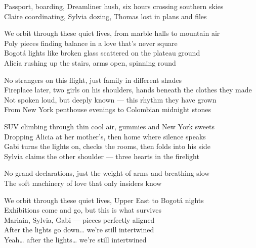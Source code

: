 \begin{lyrics}
Passport, boarding, Dreamliner hush, six hours crossing southern skies\\
Claire coordinating, Sylvia dozing, Thomas lost in plans and files

We orbit through these quiet lives, from marble halls to mountain air\\
Poly pieces finding balance in a love that’s never square\\
Bogotá lights like broken glass scattered on the plateau ground\\
Alicia rushing up the stairs, arms open, spinning round

No strangers on this flight, just family in different shades\\
Fireplace later, two girls on his shoulders, hands beneath the clothes they made\\
Not spoken loud, but deeply known — this rhythm they have grown\\
From New York penthouse evenings to Colombian midnight stones

SUV climbing through thin cool air, gummies and New York sweets\\
Dropping Alicia at her mother’s, then home where silence speaks\\
Gabi turns the lights on, checks the rooms, then folds into his side\\
Sylvia claims the other shoulder — three hearts in the firelight

No grand declarations, just the weight of arms and breathing slow\\
The soft machinery of love that only insiders know

We orbit through these quiet lives, Upper East to Bogotá nights\\
Exhibitions come and go, but this is what survives\\
Mariain, Sylvia, Gabi — pieces perfectly aligned\\
After the lights go down… we’re still intertwined\\
Yeah… after the lights… we’re still intertwined
\end{lyrics}

